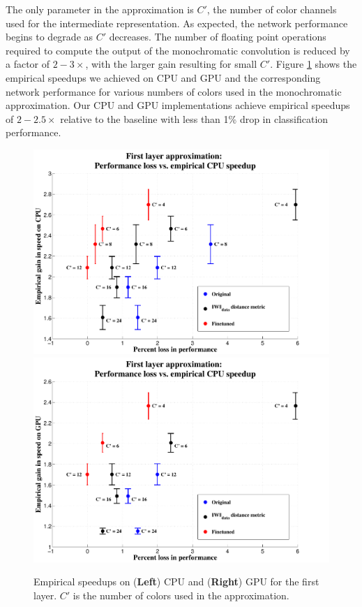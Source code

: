 The only parameter in the approximation is $C'$, the number of color channels used for the intermediate representation. As expected, the network performance begins to degrade as $C'$ decreases. 
The number of floating point operations required to compute the output of the monochromatic convolution is reduced by a factor of $2-3\times$, with the larger gain resulting for small $C'$. 
Figure \ref{fig:mono_speedups} shows the empirical speedups we achieved on CPU and GPU and the corresponding network performance for various numbers of colors used in the monochromatic approximation.   
Our CPU and GPU implementations achieve empirical speedups of $2-2.5\times$ relative to the baseline with less than 1\% drop in classification performance. 

\begin{figure}[t]
\centering
\begin{minipage}{0.9\textwidth}
      \includegraphics[width=0.5\linewidth]{img/layer1_CPUspeedup_vs_performance_loss_finetune_and_orig.pdf}
	\quad
      \includegraphics[width=0.5\linewidth]{img/layer1_GPUspeedup_vs_performance_loss_finetune_and_orig.pdf}
\end{minipage}
\caption{Empirical speedups on ({\bf Left}) CPU and ({\bf Right}) GPU for the first layer. $C'$ is the number of colors used in the approximation.}
\label{fig:mono_speedups}
\end{figure}

